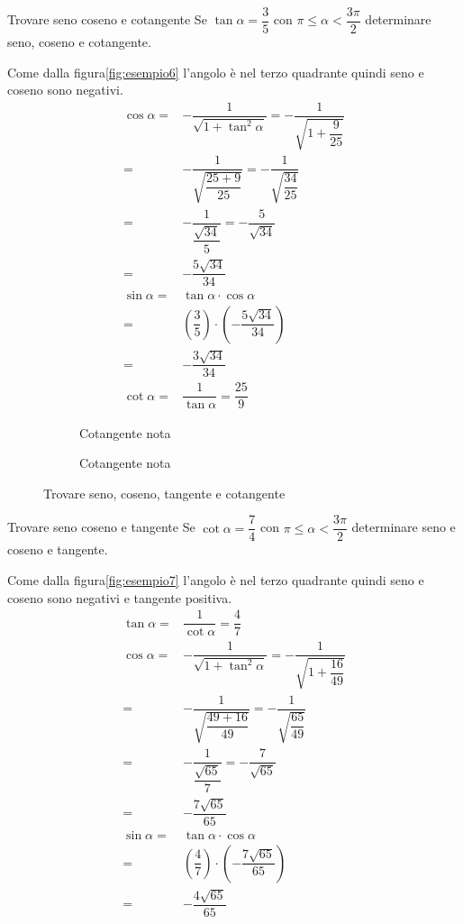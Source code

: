 \begin{esempiot}{Trovare seno coseno e cotangente}{}
	Se $\tan\alpha=\dfrac{3}{5}$ con $\pi\leq\alpha<\dfrac{3\pi}{2}$ determinare seno, coseno e cotangente.
\end{esempiot}
Come dalla figura\nobs\vref{fig:esempio6} l'angolo è nel terzo quadrante quindi seno e coseno sono negativi.
\begin{align*}
\cos\alpha=&-\dfrac{1}{\sqrt{1+\tan^2\alpha}}=-\dfrac{1}{\sqrt{1+\dfrac{9}{25}}}\\
=&-\dfrac{1}{\sqrt{\dfrac{25+9}{25}}}=-\dfrac{1}{\sqrt{\dfrac{34}{25}}}\\
=&-\dfrac{1}{\dfrac{\sqrt{34}}{5}}=-\dfrac{5}{\sqrt{34}}\\
=&-\dfrac{5\sqrt{34}}{34}\\
\sin\alpha=&\tan\alpha\cdot\cos\alpha\\
=&\left(\dfrac{3}{5}\right)\cdot\left(-\dfrac{5\sqrt{34}}{34}\right)\\
=&-\dfrac{3\sqrt{34}}{34}\\
\cot\alpha=&\dfrac{1}{\tan\alpha}=\dfrac{25}{9}
\end{align*}
\begin{figure}
	\begin{subfigure}[b]{.5\linewidth}
		\centering
		
		\captionsetup{format=esempio}
		\caption{Cotangente nota}\label{fig:esempio7}
	\end{subfigure}%
	\begin{subfigure}[b]{.5\linewidth}
		\centering
		
		\captionsetup{format=esempio}
		\caption{Cotangente nota}\label{fig:esempio8}
	\end{subfigure}%
	\quad
\caption{Trovare seno, coseno, tangente e cotangente}
\end{figure}
\begin{esempiot}{Trovare seno coseno e tangente}{}
	Se $\cot\alpha=\dfrac{7}{4}$ con $\pi\leq\alpha<\dfrac{3\pi}{2}$ determinare seno e coseno e tangente.
\end{esempiot}
Come dalla figura\nobs\vref{fig:esempio7} l'angolo è nel terzo quadrante quindi seno e coseno sono negativi e tangente positiva.
\begin{align*}
\tan\alpha=&\dfrac{1}{\cot\alpha}=\dfrac{4}{7}\\
\cos\alpha=&-\dfrac{1}{\sqrt{1+\tan^2\alpha}}=-\dfrac{1}{\sqrt{1+\dfrac{16}{49}}}\\
=&-\dfrac{1}{\sqrt{\dfrac{49+16}{49}}}=-\dfrac{1}{\sqrt{\dfrac{65}{49}}}\\
=&-\dfrac{1}{\dfrac{\sqrt{65}}{7}}=-\dfrac{7}{\sqrt{65}}\\
=&-\dfrac{7\sqrt{65}}{65}\\
\sin\alpha=&\tan\alpha\cdot\cos\alpha\\
=&\left(\dfrac{4}{7}\right)\cdot\left(-\dfrac{7\sqrt{65}}{65}\right)\\
=&-\dfrac{4\sqrt{65}}{65}\\ 
\end{align*}

